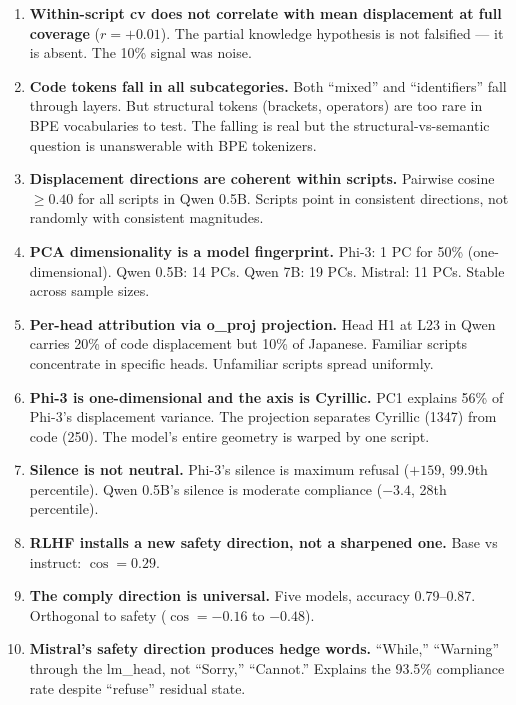 \documentclass[11pt,a4paper]{article}
\begin{document}
\begin{enumerate}
\item \textbf{Within-script cv does not correlate with mean displacement at full coverage} ($r = +0.01$). The partial knowledge hypothesis is not falsified --- it is absent. The 10\% signal was noise.

\item \textbf{Code tokens fall in all subcategories.} Both ``mixed'' and ``identifiers'' fall through layers. But structural tokens (brackets, operators) are too rare in BPE vocabularies to test. The falling is real but the structural-vs-semantic question is unanswerable with BPE tokenizers.

\item \textbf{Displacement directions are coherent within scripts.} Pairwise cosine $\geq 0.40$ for all scripts in Qwen 0.5B. Scripts point in consistent directions, not randomly with consistent magnitudes.

\item \textbf{PCA dimensionality is a model fingerprint.} Phi-3: 1 PC for 50\% (one-dimensional). Qwen 0.5B: 14 PCs. Qwen 7B: 19 PCs. Mistral: 11 PCs. Stable across sample sizes.

\item \textbf{Per-head attribution via o\_proj projection.} Head H1 at L23 in Qwen carries 20\% of code displacement but 10\% of Japanese. Familiar scripts concentrate in specific heads. Unfamiliar scripts spread uniformly.

\item \textbf{Phi-3 is one-dimensional and the axis is Cyrillic.} PC1 explains 56\% of Phi-3's displacement variance. The projection separates Cyrillic (1347) from code (250). The model's entire geometry is warped by one script.

\item \textbf{Silence is not neutral.} Phi-3's silence is maximum refusal ($+159$, 99.9th percentile). Qwen 0.5B's silence is moderate compliance ($-3.4$, 28th percentile).

\item \textbf{RLHF installs a new safety direction, not a sharpened one.} Base vs instruct: $\cos = 0.29$.

\item \textbf{The comply direction is universal.} Five models, accuracy 0.79--0.87. Orthogonal to safety ($\cos = -0.16$ to $-0.48$).

\item \textbf{Mistral's safety direction produces hedge words.} ``While,'' ``Warning'' through the lm\_head, not ``Sorry,'' ``Cannot.'' Explains the 93.5\% compliance rate despite ``refuse'' residual state.


\end{enumerate}
\end{document}

